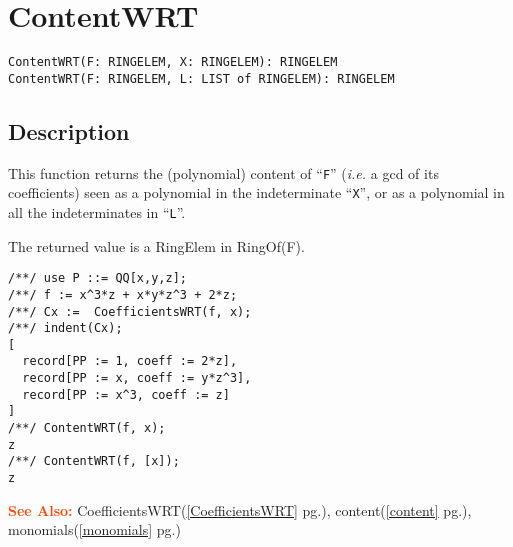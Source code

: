 \documentclass[a4paper]{mybook}
\newenvironment{command}{}{} %
\newcommand\SeeAlso{\par\textcolor{OrangeRed}{\textbf{\large See Also: }}}
\begin{document}
\section{ContentWRT}
\label{ContentWRT}
\begin{command} %


\begin{Verbatim}[label=syntax, rulecolor=\color{MidnightBlue},
frame=single]
ContentWRT(F: RINGELEM, X: RINGELEM): RINGELEM
ContentWRT(F: RINGELEM, L: LIST of RINGELEM): RINGELEM
\end{Verbatim}


\subsection*{Description}

This function returns the (polynomial) content of ``\verb&F&'' (\textit{i.e.} a gcd of its
coefficients) seen as a polynomial in the indeterminate ``\verb&X&'', or as a
polynomial in all the indeterminates in ``\verb&L&''.
\par 
The returned value is a RingElem in RingOf(F).
\begin{Verbatim}[label=example, rulecolor=\color{PineGreen}, frame=single]
/**/ use P ::= QQ[x,y,z];
/**/ f := x^3*z + x*y*z^3 + 2*z;
/**/ Cx :=  CoefficientsWRT(f, x);
/**/ indent(Cx);
[
  record[PP := 1, coeff := 2*z],
  record[PP := x, coeff := y*z^3],
  record[PP := x^3, coeff := z]
]
/**/ ContentWRT(f, x);
z
/**/ ContentWRT(f, [x]);
z
\end{Verbatim}


\SeeAlso %
  CoefficientsWRT(\ref{CoefficientsWRT} pg.\pageref{CoefficientsWRT}), 
    content(\ref{content} pg.\pageref{content}), 
    monomials(\ref{monomials} pg.\pageref{monomials})
\end{command} %
\end{document}
